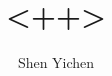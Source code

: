 \documentclass[<++>]{<++>}
\title{\huge\textsf{\textbf{<++>}}}
\date{\formatdate{<++>}{<++>}{<++>}}
\author{Shen Yichen}
\begin{document}
\begin{singlespace}
    \maketitle
\end{singlespace}

\end{document}
